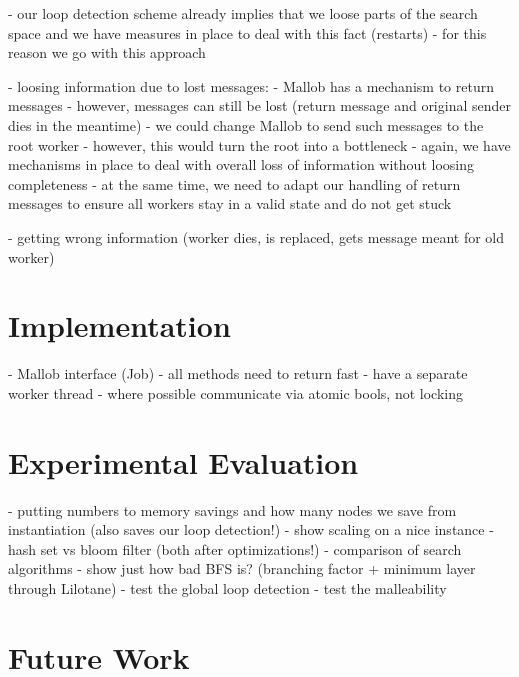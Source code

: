 \documentclass[enabledeprecatedfontcommands,12pt,a4paper,twoside]{scrartcl}
\numberwithin{equation}{section}
\begin{document}
			- our loop detection scheme already implies that we loose parts of the search space and we have measures in place to deal with this fact (restarts)
			- for this reason we go with this approach
			
	- loosing information due to lost messages:
		- Mallob has a mechanism to return messages
		- however, messages can still be lost (return message and original sender dies in the meantime)
		- we could change Mallob to send such messages to the root worker
		- however, this would turn the root into a bottleneck
		- again, we have mechanisms in place to deal with overall loss of information without loosing completeness
		- at the same time, we need to adapt our handling of return messages to ensure all workers stay in a valid state and do not get stuck
		
	- getting wrong information (worker dies, is replaced, gets message meant for old worker)



\section{Implementation}
- Mallob interface (Job)
- all methods need to return fast
- have a separate worker thread
- where possible communicate via atomic bools, not locking




\section{Experimental Evaluation}
- putting numbers to memory savings and how many nodes we save from instantiation (also saves our loop detection!)
- show scaling on a nice instance
- hash set vs bloom filter (both after optimizations!)
- comparison of search algorithms
	- show just how bad BFS is? (branching factor + minimum layer through Lilotane)
- test the global loop detection
- test the malleability

\section{Future Work}


\clearpage




\end{document}
